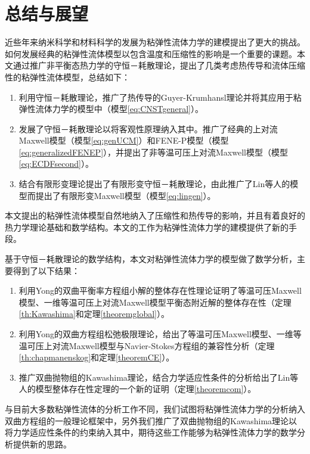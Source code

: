 \chapter{总结与展望}

% 
近些年来纳米科学和材料科学的发展为粘弹性流体力学的建模提出了更大的挑战。如何发展经典的粘弹性流体模型以包含温度和压缩性的影响是一个重要的课题。本文通过推广非平衡态热力学的守恒－耗散理论，提出了几类考虑热传导和流体压缩性的粘弹性流体模型，总结如下：
\begin{enumerate}
	\item 利用守恒－耗散理论，推广了热传导的Guyer-Krumhansl理论并将其应用于粘弹性流体力学的模型中（模型\eqref{eq:CNSTgeneral}）。
	\item 发展了守恒－耗散理论以将客观性原理纳入其中。推广了经典的上对流Maxwell模型（模型\eqref{eq:genUCM}）和FENE-P模型（模型\eqref{eq:generalizedFENEP}），并提出了非等温可压上对流Maxwell模型（模型\eqref{eq:ECDFsecond}）。
	\item 结合有限形变理论提出了有限形变守恒－耗散理论，由此推广了Lin等人的模型而提出了有限形变Maxwell模型（模型\eqref{eq:lingen}）。
\end{enumerate}
本文提出的粘弹性流体模型自然地纳入了压缩性和热传导的影响，并且有着良好的热力学理论基础和数学结构。本文的工作为粘弹性流体力学的建模提供了新的手段。

基于守恒－耗散理论的数学结构，本文对粘弹性流体力学的模型做了数学分析，主要得到了以下结果：
\begin{enumerate}
	\item 利用Yong的双曲平衡率方程组小解的整体存在性理论证明了等温可压Maxwell模型、一维等温可压上对流Maxwell模型平衡态附近解的整体存在性（定理\ref{th:Kawashima}和定理\ref{theoremglobal}）。
	\item 利用Yong的双曲方程组松弛极限理论，给出了等温可压Maxwell模型、一维等温可压上对流Maxwell模型与Navier-Stokes方程组的兼容性分析（定理\ref{th:chapmanenskog}和定理\ref{theoremCE}）。
	\item 推广双曲抛物组的Kawashima理论，结合力学适应性条件的分析给出了Lin等人的模型整体存在性定理的一个新的证明（定理\ref{theoremcom}）。
\end{enumerate}
与目前大多数粘弹性流体的分析工作不同，我们试图将粘弹性流体力学的分析纳入双曲方程组的一般理论框架中，另外我们推广了双曲抛物组的Kawashima理论以将力学适应性条件的约束纳入其中，期待这些工作能够为粘弹性流体力学的数学分析提供新的思路。


